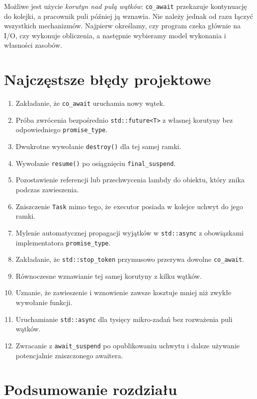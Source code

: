 Możliwe jest użycie \emph{korutyn nad pulą wątków}: \texttt{co\_await}
przekazuje kontynuację do kolejki, a pracownik puli później ją wznawia.
Nie należy jednak od razu łączyć wszystkich mechanizmów.
Najpierw określamy, czy program czeka głównie na I/O, czy wykonuje
obliczenia, a następnie wybieramy model wykonania i własności zasobów.

\section{Najczęstsze błędy projektowe}

\begin{enumerate}
\item Zakładanie, że \texttt{co\_await} uruchamia nowy wątek.
\item Próba zwrócenia bezpośrednio \texttt{std::future<T>}
      z własnej korutyny bez odpowiedniego \texttt{promise\_type}.
\item Dwukrotne wywołanie \texttt{destroy()} dla tej samej ramki.
\item Wywołanie \texttt{resume()} po osiągnięciu
      \texttt{final\_suspend}.
\item Pozostawienie referencji lub przechwycenia lambdy do obiektu,
      który znika podczas zawieszenia.
\item Zniszczenie \texttt{Task} mimo tego, że executor posiada
      w kolejce uchwyt do jego ramki.
\item Mylenie automatycznej propagacji wyjątków w \texttt{std::async}
      z obowiązkami implementatora \texttt{promise\_type}.
\item Zakładanie, że \texttt{std::stop\_token} przymusowo przerywa
      dowolne \texttt{co\_await}.
\item Równoczesne wznawianie tej samej korutyny z kilku wątków.
\item Uznanie, że zawieszenie i wznowienie zawsze kosztuje mniej
      niż zwykłe wywołanie funkcji.
\item Uruchamianie \texttt{std::async} dla tysięcy mikro-zadań
      bez rozważenia puli wątków.
\item Zwracanie z \texttt{await\_suspend} po opublikowaniu uchwytu
      i dalsze używanie potencjalnie zniszczonego awaitera.
\end{enumerate}

\section*{Podsumowanie rozdziału}

